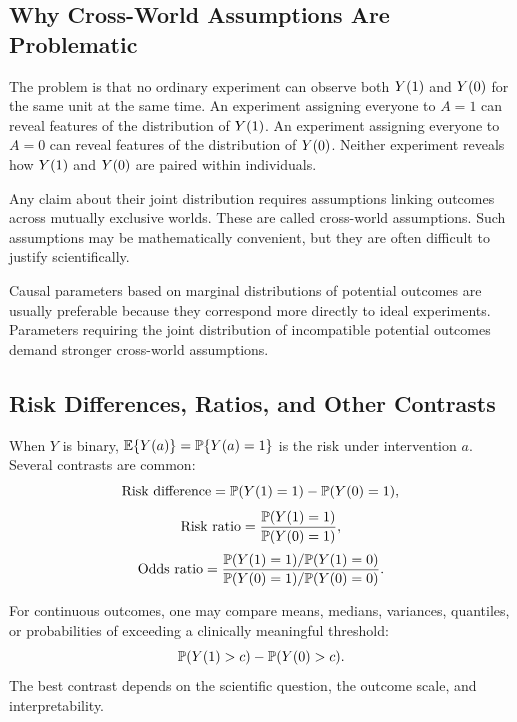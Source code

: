 \subsection{Why Cross-World Assumptions Are Problematic}

The problem is that no ordinary experiment can observe both $Y(1)$ and $Y(0)$ for the same unit at the same time. An experiment assigning everyone to $A=1$ can reveal features of the distribution of $Y(1)$. An experiment assigning everyone to $A=0$ can reveal features of the distribution of $Y(0)$. Neither experiment reveals how $Y(1)$ and $Y(0)$ are paired within individuals.

Any claim about their joint distribution requires assumptions linking outcomes across mutually exclusive worlds. These are called cross-world assumptions. Such assumptions may be mathematically convenient, but they are often difficult to justify scientifically.

\begin{keyidea}
Causal parameters based on marginal distributions of potential outcomes are usually preferable because they correspond more directly to ideal experiments. Parameters requiring the joint distribution of incompatible potential outcomes demand stronger cross-world assumptions.
\end{keyidea}

\subsection{Risk Differences, Ratios, and Other Contrasts}

When $Y$ is binary, $\mathbb{E}\{Y(a)\}=\mathbb{P}\{Y(a)=1\}$ is the risk under intervention $a$. Several contrasts are common:
\[
\text{Risk difference}=
\mathbb{P}(Y(1)=1)-\mathbb{P}(Y(0)=1),
\]
\[
\text{Risk ratio}=
\frac{\mathbb{P}(Y(1)=1)}{\mathbb{P}(Y(0)=1)},
\]
\[
\text{Odds ratio}=
\frac{\mathbb{P}(Y(1)=1)/\mathbb{P}(Y(1)=0)}
{\mathbb{P}(Y(0)=1)/\mathbb{P}(Y(0)=0)}.
\]

For continuous outcomes, one may compare means, medians, variances, quantiles, or probabilities of exceeding a clinically meaningful threshold:
\[
\mathbb{P}(Y(1)>c)-\mathbb{P}(Y(0)>c).
\]
The best contrast depends on the scientific question, the outcome scale, and interpretability.
